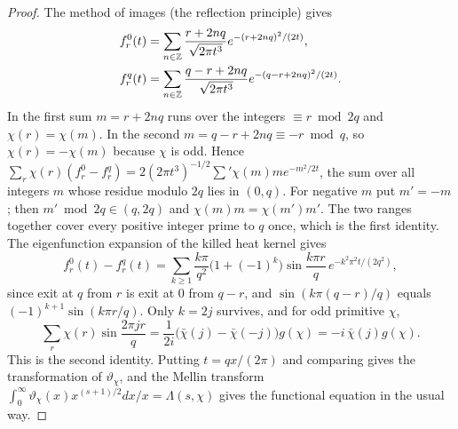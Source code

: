 \begin{proof}
The method of images (the reflection principle) gives
\[
\begin{aligned}
f_r^0(t)&=\sum_{n\in\mathbb{Z}}\frac{r+2nq}{\sqrt{2\pi t^3}}e^{-(r+2nq)^2/(2t)},\\
f_r^q(t)&=\sum_{n\in\mathbb{Z}}\frac{q-r+2nq}{\sqrt{2\pi t^3}}e^{-(q-r+2nq)^2/(2t)} .
\end{aligned}
\]
In the first sum $m=r+2nq$ runs over the integers $\equiv r\bmod 2q$ and $\chi(r)=\chi(m)$. In the second $m=q-r+2nq\equiv-r\bmod q$, so $\chi(r)=-\chi(m)$ because $\chi$ is odd. Hence $\sum_r\chi(r)(f_r^0-f_r^q)=2(2\pi t^3)^{-1/2}\sum'\chi(m)me^{-m^2/2t}$, the sum over all integers $m$ whose residue modulo $2q$ lies in $(0,q)$. For negative $m$ put $m'=-m$; then $m'\bmod2q\in(q,2q)$ and $\chi(m)m=\chi(m')m'$. The two ranges together cover every positive integer prime to $q$ once, which is the first identity. The eigenfunction expansion of the killed heat kernel gives
\[
f_r^0(t)-f_r^q(t)=\sum_{k\ge1}\frac{k\pi}{q^2}\bigl(1+(-1)^k\bigr)\sin\frac{k\pi r}q\,e^{-k^2\pi^2t/(2q^2)},
\]
since exit at $q$ from $r$ is exit at $0$ from $q-r$, and $\sin(k\pi(q-r)/q)$ equals $(-1)^{k+1}\sin(k\pi r/q)$. Only $k=2j$ survives, and for odd primitive $\chi$,
\[
\sum_r\chi(r)\sin\frac{2\pi jr}q=\frac1{2i}\bigl(\bar\chi(j)-\bar\chi(-j)\bigr)g(\chi)=-i\,\bar\chi(j)g(\chi).
\] This is the second identity. Putting $t=qx/(2\pi)$ and comparing gives the transformation of $\vartheta_\chi$, and the Mellin transform $\int_0^\infty\vartheta_\chi(x)x^{(s+1)/2}dx/x=\Lambda(s,\chi)$ gives the functional equation in the usual way.
\end{proof}

